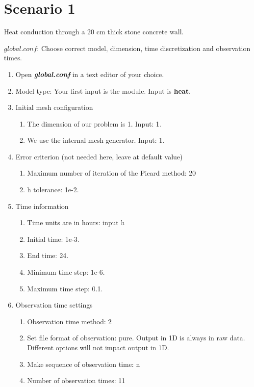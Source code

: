 \section*{Scenario 1}

Heat conduction through a 20 cm thick stone concrete wall. 

$global.conf$: Choose correct model, dimension, time discretization and observation times.
\begin{enumerate}
\item Open \textbf{\emph{global.conf}} in a text editor of your choice. 
\item Model type: Your first input is the module. Input is \textbf{heat}.
\item Initial mesh configuration \begin{enumerate}
\item The dimension of our problem is 1. Input: 1.
\item We use the internal mesh generator. Input: 1. 
\end{enumerate}
\item Error criterion (not needed here, leave at default value) \begin{enumerate} 
\item Maximum number of iteration of the Picard method: 20 
\item h tolerance: 1e-2.
\end{enumerate}
\item Time information 
\begin{enumerate} 
\item Time units are in hours: input h
\item Initial time: 1e-3.
\item End time: 24.
\item Minimum time step: 1e-6.
\item Maximum time step: 0.1.
\end{enumerate}
\item Observation time settings \begin{enumerate}
\item Observation time method: 2
\item Set file format of observation: pure. Output in 1D is always in raw data. Different options will not impact output in 1D.
\item Make sequence of observation time: n
\item Number of observation times: 11

\end{enumerate}
\end{enumerate}
